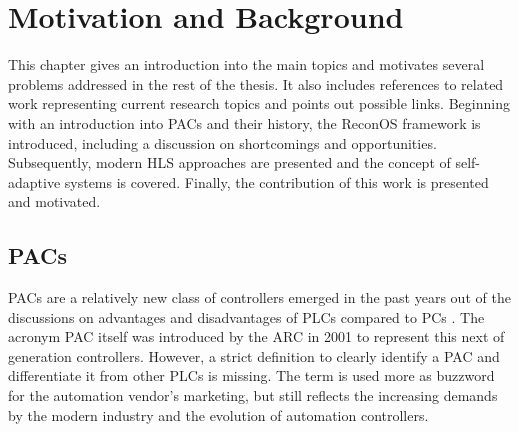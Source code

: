 \chapter{Motivation and Background}
\label{chap:motivation}
This chapter gives an introduction into the main topics and motivates several
problems addressed in the rest of the thesis. It also includes references to
related work representing current research topics and points out possible
links. Beginning with an introduction into \acp{PAC} and their history, the
ReconOS framework is introduced, including a discussion on shortcomings and
opportunities. Subsequently, modern \ac{HLS} approaches are presented and the
concept of self-adaptive systems is covered. Finally, the contribution of this
work is presented and motivated.

\section{\aclp{PAC}}
\aclp{PAC} are a relatively new class of controllers emerged in the past years
out of the discussions on advantages and disadvantages of \acp{PLC} compared
to \acp{PC} \citep{bel05}. The acronym \ac{PAC} itself was introduced by the
\ac{ARC} in 2001 \citep{pay13} to represent this next of generation
controllers. However, a strict definition to clearly identify a \ac{PAC} and
differentiate it from other \acp{PLC} is missing. The term is used more as
buzzword for the automation vendor's marketing, but still reflects the
increasing demands by the modern industry and the evolution of automation
controllers.

